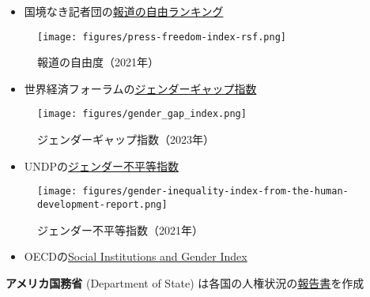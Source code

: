 \documentclass[
  xelatex,
  ja=standard]{bxjsarticle}
\providecommand{\tightlist}{%
  \setlength{\itemsep}{0pt}\setlength{\parskip}{0pt}}\usepackage{longtable,booktabs,array}
\begin{document}
\begin{itemize}
\tightlist
\item
  国境なき記者団の\href{https://rsf.org/en/ranking}{報道の自由ランキング}
\end{itemize}

\begin{figure}[htpb]

{\centering \texttt{[image: figures/press-freedom-index-rsf.png]}

}

\caption{報道の自由度（2021年）}

\end{figure}

\begin{itemize}
\tightlist
\item
  世界経済フォーラムの\href{https://jp.weforum.org/reports/global-gender-gap-report-2023}{ジェンダーギャップ指数}
\end{itemize}

\begin{figure}[htpb]

{\centering \texttt{[image: figures/gender\_gap\_index.png]}

}

\caption{ジェンダーギャップ指数（2023年）}

\end{figure}

\begin{itemize}
\tightlist
\item
  UNDPの\href{https://hdr.undp.org/data-center/thematic-composite-indices/gender-inequality-index\#/indicies/GII}{ジェンダー不平等指数}
\end{itemize}

\begin{figure}[htpb]

{\centering \texttt{[image: figures/gender-inequality-index-from-the-human-development-report.png]}

}

\caption{ジェンダー不平等指数（2021年）}

\end{figure}

\begin{itemize}
\tightlist
\item
  OECDの\href{https://www.genderindex.org/}{Social Institutions and
  Gender Index}
\end{itemize}

\textbf{アメリカ国務省} (Department of State)
は各国の人権状況の\href{https://jp.usembassy.gov/ja/category/reports-ja/}{報告書}を作成
\end{document}
